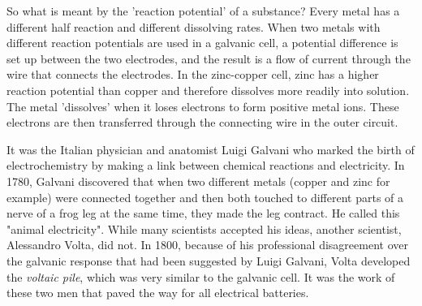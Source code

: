 So what is meant by the 'reaction potential' of a substance? Every metal has a different half reaction and different dissolving rates. When two metals with different reaction potentials are used in a galvanic cell, a potential difference is set up between the two electrodes, and the result is a flow of current through the wire that connects the electrodes. In the zinc-copper cell, zinc has a higher reaction potential than copper and therefore dissolves more readily into solution. The metal 'dissolves' when it loses electrons to form positive metal ions. These electrons are then transferred through the connecting wire in the outer circuit. 


\begin{IFact}{It was the Italian physician and anatomist Luigi Galvani who marked the birth of electrochemistry by making a link between chemical reactions and electricity. In 1780, Galvani discovered that when two different metals (copper and zinc for example) were connected together and then both touched to different parts of a nerve of a frog leg at the same time, they made the leg contract. He called this "animal electricity". While many scientists accepted his ideas, another scientist, Alessandro Volta, did not. In 1800, because of his professional disagreement over the galvanic response that had been suggested by Luigi Galvani, Volta developed the \textit{voltaic pile}, which was very similar to the galvanic cell. It was the work of these two men that paved the way for all electrical batteries.}
\end{IFact}


